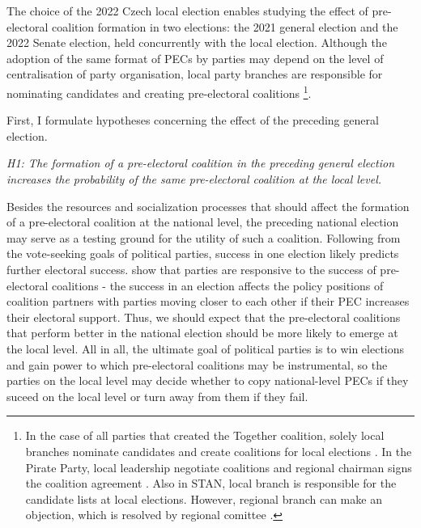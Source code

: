 \documentclass[]{interact}
\theoremstyle{plain}%
\theoremstyle{definition}
\theoremstyle{remark}
\begin{document}
The choice of the 2022 Czech local election enables studying the effect of pre-electoral coalition formation in two elections: the 2021 general election and the 2022 Senate election, held concurrently with the local election. Although the adoption of the same format of PECs by parties may depend on the level of centralisation of party organisation, local party branches are responsible for nominating candidates and creating pre-electoral coalitions \footnote{In the case of all parties that created the Together coalition, solely local branches nominate candidates and create coalitions for local elections \citep{ods, kdu, top09}. In the Pirate Party, local leadership negotiate coalitions and regional chairman signs the coalition agreement \citep{pirati}. Also in STAN, local branch is responsible for the candidate lists at local elections. However, regional branch can make an objection, which is resolved by regional comittee \citep{stan}.}.

First, I formulate hypotheses concerning the effect of the preceding general election.

\vspace{12pt}
\textit{H1: The formation of a pre-electoral coalition in the preceding general election increases the probability of the same pre-electoral coalition at the local level.\label{hyp:1}}
\vspace{12pt}

Besides the resources and socialization processes that should affect the formation of a pre-electoral coalition at the national level, the preceding national election may serve as a testing ground for the utility of such a coalition. Following from the vote-seeking goals of political parties, success in one election likely predicts further electoral success. \citet{greene2017} show that parties are responsive to the success of pre-electoral coalitions - the success in an election affects the policy positions of coalition partners with parties moving closer to each other if their PEC increases their electoral support. Thus, we should expect that the pre-electoral coalitions that perform better in the national election should be more likely to emerge at the local level. All in all, the ultimate goal of political parties is to win elections and gain power to which pre-electoral coalitions may be instrumental, so the parties on the local level may decide whether to copy national-level PECs if they suceed on the local level or turn away from them if they fail.  
\end{document}
